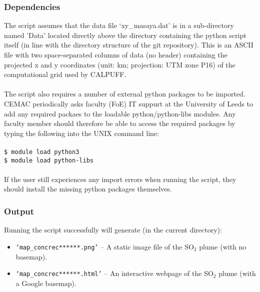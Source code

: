 \documentclass[10pt,a4paper]{article}
\newcommand\tab[1][0.5cm]{\hspace*{#1}}
\begin{document}
\subsubsection{Dependencies}
The script assumes that the data file `xy\_masaya.dat' is in a sub-directory named 'Data' located directly above the directory containing the python script itself (in line with the directory structure of the git repository). This is an ASCII file with two space-separated columns of data (no header) containing the projected x and y coordinates (unit: km; projection: UTM zone P16) of the computational grid used by CALPUFF.\\\\
The script also requires a number of external python packages to be imported. CEMAC periodically asks faculty (FoE) IT suppurt at the University of Leeds to add any required packaes to the loadable python/python-libs modules. Any faculty member should therefore be able to access the required packages by typing the following into the UNIX command line:\\\\
\tab \texttt{\$ module load python3}\\
\tab \texttt{\$ module load python-libs}\\\\
If the user still experiences any import errors when running the script, they should install the missing python packages themselves.

\subsubsection{Output}
Running the script successfully will generate (in the current directory):
\begin{itemize}
\item \texttt{`map\_concrec******.png'} -- A static image file of the SO$_2$ plume (with no basemap).
\item \texttt{`map\_concrec******.html'} -- An interactive webpage of the SO$_2$ plume (with a Google basemap).
\end{itemize}
\end{document}

